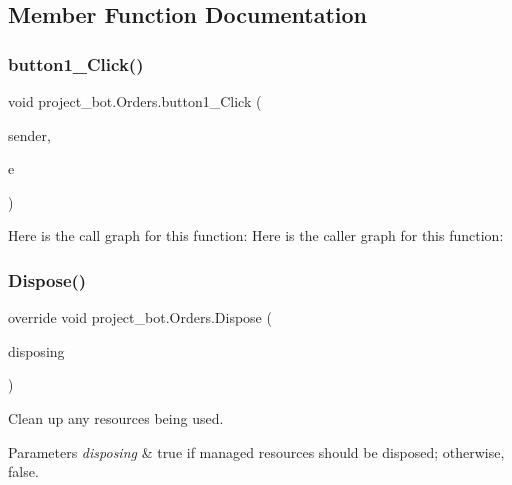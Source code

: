 \subsection{Member Function Documentation}
\mbox{\label{classproject__bot_1_1_orders_adfd8b1ab81941bd2c3f22157d5e78378}} 
\subsubsection{\texorpdfstring{button1\+\_\+\+Click()}{button1\_Click()}}
{\footnotesize\ttfamily void project\+\_\+bot.\+Orders.\+button1\+\_\+\+Click (\begin{DoxyParamCaption}\item[{object}]{sender,  }\item[{Event\+Args}]{e }\end{DoxyParamCaption})\hspace{0.3cm}{\ttfamily [private]}}

Here is the call graph for this function\+:
Here is the caller graph for this function\+:
\mbox{\label{classproject__bot_1_1_orders_ac53ed0265f77bd3f88a095c6df3f2601}} 
\subsubsection{\texorpdfstring{Dispose()}{Dispose()}}
{\footnotesize\ttfamily override void project\+\_\+bot.\+Orders.\+Dispose (\begin{DoxyParamCaption}\item[{bool}]{disposing }\end{DoxyParamCaption})\hspace{0.3cm}{\ttfamily [protected]}}



Clean up any resources being used. 


\begin{DoxyParams}{Parameters}
{\em disposing} & true if managed resources should be disposed; otherwise, false.\\
\hline
\end{DoxyParams}
\mbox{\label{classproject__bot_1_1_orders_a68deaeda6bfb30c919e85e7304037ad5}} 
